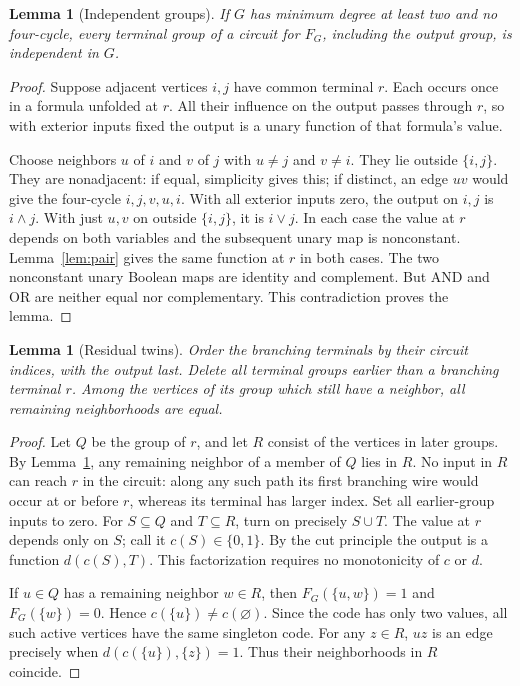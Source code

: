 \documentclass[11pt]{article}
\newcommand{\AND}{\mathbin{\wedge}}
\newcommand{\OR}{\mathbin{\vee}}
\newtheorem{lemma}[theorem]{Lemma}
\theoremstyle{definition}
\theoremstyle{remark}
\begin{document}
\begin{lemma}[Independent groups]\label{lem:independent}
If $G$ has minimum degree at least two and no four-cycle, every terminal
group of a circuit for $F_G$, including the output group, is independent
in $G$.
\end{lemma}
\begin{proof}
Suppose adjacent vertices $i,j$ have common terminal $r$. Each occurs once
in a formula unfolded at $r$. All their influence on the output passes
through $r$, so with exterior inputs fixed the output is a unary function
of that formula's value.

Choose neighbors $u$ of $i$ and $v$ of $j$ with $u\ne j$ and $v\ne i$.
They lie outside $\{i,j\}$. They are nonadjacent: if equal, simplicity
gives this; if distinct, an edge $uv$ would give the four-cycle
$i,j,v,u,i$. With all exterior inputs zero, the output on $i,j$ is
$i\AND j$. With just $u,v$ on outside $\{i,j\}$, it is $i\OR j$.
In each case the value at $r$ depends on both variables and the subsequent
unary map is nonconstant. Lemma~\ref{lem:pair} gives the same function at
$r$ in both cases. The two nonconstant unary Boolean maps are identity
and complement. But AND and OR are neither equal nor complementary.
This contradiction proves the lemma.
\end{proof}

\begin{lemma}[Residual twins]\label{lem:twins}
Order the branching terminals by their circuit indices, with the output
last. Delete all terminal groups earlier than a branching terminal $r$.
Among the vertices of its group which still have a neighbor, all remaining
neighborhoods are equal.
\end{lemma}
\begin{proof}
Let $Q$ be the group of $r$, and let $R$ consist of the vertices in later
groups. By Lemma~\ref{lem:independent}, any remaining neighbor of a member
of $Q$ lies in $R$.
No input in $R$ can reach $r$ in the circuit: along any such path its
first branching wire would occur at or before $r$, whereas its terminal
has larger index. Set all earlier-group inputs to zero. For $S\subseteq Q$
and $T\subseteq R$, turn on precisely $S\cup T$. The value at $r$ depends
only on $S$; call it $c(S)\in\{0,1\}$. By the cut principle the output is
a function $d(c(S),T)$. This factorization requires no monotonicity of
$c$ or $d$.

If $u\in Q$ has a remaining neighbor $w\in R$, then
$F_G(\{u,w\})=1$ and $F_G(\{w\})=0$. Hence
$c(\{u\})\ne c(\varnothing)$. Since the code has only two values,
all such active vertices have the same singleton code. For any $z\in R$,
$uz$ is an edge precisely when $d(c(\{u\}),\{z\})=1$.
Thus their neighborhoods in $R$ coincide.
\end{proof}
\end{document}
